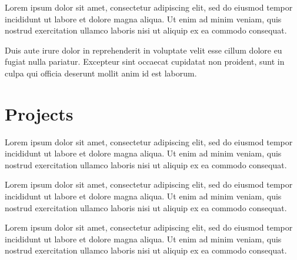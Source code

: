 \documentclass[]{SWE-resume-openfont}
\begin{document}
\begin{minipage}[t]{0.60\textwidth}
\newline
{} %
\begin{tightemize}
\item Lorem ipsum dolor sit amet, consectetur adipiscing elit, sed do eiusmod tempor incididunt ut labore et dolore magna aliqua. Ut enim ad minim veniam, quis nostrud exercitation ullamco laboris nisi ut aliquip ex ea commodo consequat. 
\item Duis aute irure dolor in reprehenderit in voluptate velit esse cillum dolore eu fugiat nulla pariatur. Excepteur sint occaecat cupidatat non proident, sunt in culpa qui officia deserunt mollit anim id est laborum.
\end{tightemize}
\sectionsep


\section{Projects}

\location{}
Lorem ipsum dolor sit amet, consectetur adipiscing elit, sed do eiusmod tempor incididunt ut labore et dolore magna aliqua. Ut enim ad minim veniam, quis nostrud exercitation ullamco laboris nisi ut aliquip ex ea commodo consequat. 
\sectionsep

\location{}
Lorem ipsum dolor sit amet, consectetur adipiscing elit, sed do eiusmod tempor incididunt ut labore et dolore magna aliqua. Ut enim ad minim veniam, quis nostrud exercitation ullamco laboris nisi ut aliquip ex ea commodo consequat. 
\sectionsep

\location{}
Lorem ipsum dolor sit amet, consectetur adipiscing elit, sed do eiusmod tempor incididunt ut labore et dolore magna aliqua. Ut enim ad minim veniam, quis nostrud exercitation ullamco laboris nisi ut aliquip ex ea commodo consequat. 
\sectionsep

%
%

\end{minipage} 
\end{document}
